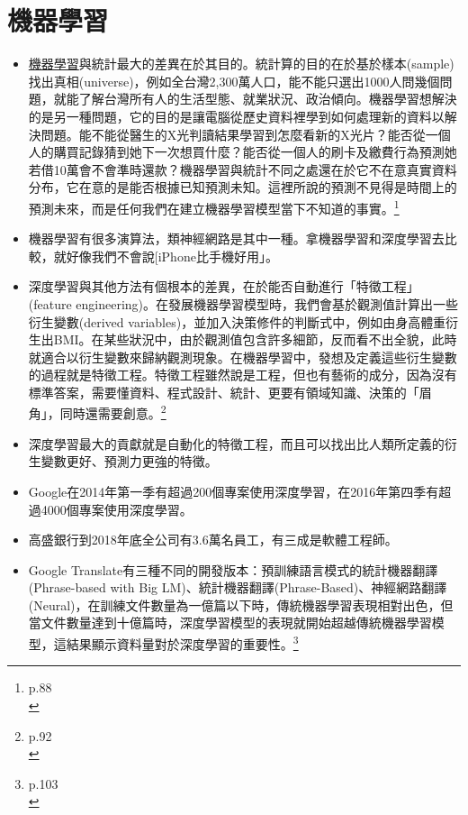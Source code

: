 \documentclass[a4paper,12pt]{article}
\begin{document}
\section{機器學習}
\label{sec:orgf7a464a}
\begin{itemize}
\item \href{20221023101456-機器學習.org}{機器學習}與統計最大的差異在於其目的。統計算的目的在於基於樣本(sample)找出真相(universe)，例如全台灣2,300萬人口，能不能只選出1000人問幾個問題，就能了解台灣所有人的生活型態、就業狀況、政治傾向。機器學習想解決的是另一種問題，它的目的是讓電腦從歷史資料裡學到如何處理新的資料以解決問題。能不能從醫生的X光判讀結果學習到怎麼看新的X光片？能否從一個人的購買記錄猜到她下一次想買什麼？能否從一個人的刷卡及繳費行為預測她若借10萬會不會準時還款？機器學習與統計不同之處還在於它不在意真實資料分布，它在意的是能否根據已知預測未知。這裡所說的預測不見得是時間上的預測未來，而是任何我們在建立機器學習模型當下不知道的事實。\footnote{p.88\\}\\
\item 機器學習有很多演算法，類神經網路是其中一種。拿機器學習和深度學習去比較，就好像我們不會說[iPhone比手機好用」。\\
\item 深度學習與其他方法有個根本的差異，在於能否自動進行「特徵工程」(feature engineering)。在發展機器學習模型時，我們會基於觀測值計算出一些衍生變數(derived variables)，並加入決策修件的判斷式中，例如由身高體重衍生出BMI。在某些狀況中，由於觀測值包含許多細節，反而看不出全貌，此時就適合以衍生變數來歸納觀測現象。在機器學習中，發想及定義這些衍生變數的過程就是特徵工程。特徵工程雖然說是工程，但也有藝術的成分，因為沒有標準答案，需要懂資料、程式設計、統計、更要有領域知識、決策的「眉角」，同時還需要創意。\footnote{p.92\\}\\
\item 深度學習最大的貢獻就是自動化的特徵工程，而且可以找出比人類所定義的衍生變數更好、預測力更強的特徵。\\
\item Google在2014年第一季有超過200個專案使用深度學習，在2016年第四季有超過4000個專案使用深度學習。\\
\item 高盛銀行到2018年底全公司有3.6萬名員工，有三成是軟體工程師。\\
\item Google Translate有三種不同的開發版本：預訓練語言模式的統計機器翻譯(Phrase-based with Big LM)、統計機器翻譯(Phrase-Based)、神經網路翻譯(Neural)，在訓練文件數量為一億篇以下時，傳統機器學習表現相對出色，但當文件數量達到十億篇時，深度學習模型的表現就開始超越傳統機器學習模型，這結果顯示資料量對於深度學習的重要性。\footnote{p.103\\}\\

\end{itemize}
\end{document}
